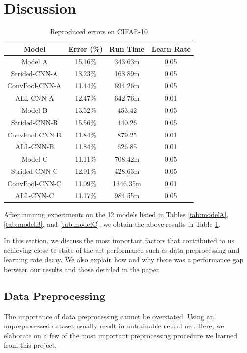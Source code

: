 \section{Discussion}
\begin{table}[H]
  \centering
  \begin{tabular}{|c c c c|}
    \hline
    Model & Error (\%) &  Run Time & Learn Rate\\
    \hline
    Model A & 15.16\% &   343.63m & 0.05\\
    Strided-CNN-A & 18.23\% &  168.89m  & 0.05\\
    ConvPool-CNN-A & 11.44\% &  694.26m & 0.05 \\
    ALL-CNN-A & 12.47\% &  642.76m  & 0.01\\
    \hline
    Model B & 13.52\% & 453.42  & 0.05\\
    Strided-CNN-B & 15.56\% & 440.26 & 0.05 \\
    ConvPool-CNN-B & 11.84\% & 879.25 & 0.01 \\
    ALL-CNN-B & 11.84\% & 626.85 &  0.01 \\
    \hline
    Model C & 11.11\% &    708.42m & 0.05 \\
    Strided-CNN-C & 12.91\% &   428.63m & 0.05 \\
    ConvPool-CNN-C & 11.09\% &   1346.35m & 0.01 \\
    ALL-CNN-C &  11.17\% &   984.55m & 0.05 \\
    \hline
  \end{tabular}
  \caption{Reproduced errors on CIFAR-10}
  \label{tab:ourResults}
\end{table}
After running experiments on the 12 models listed in Tables \ref{tab:modelA}, \ref{tab:modelB}, and \ref{tab:modelC}, we obtain the above results in Table \ref{tab:ourResults}.

In this section, we discuss the most important factors that contributed to us achieving close to state-of-the-art performance such as data preprocessing and learning rate decay. We also explain how and why there was a performance gap between our results and those detailed in the paper.

\subsection{Data Preprocessing}
The importance of data preprocessing cannot be overstated. Using an unpreprocessed dataset usually result in untrainable neural net. Here, we elaborate on a few of the most important preprocessing procedure we learned from this project.
